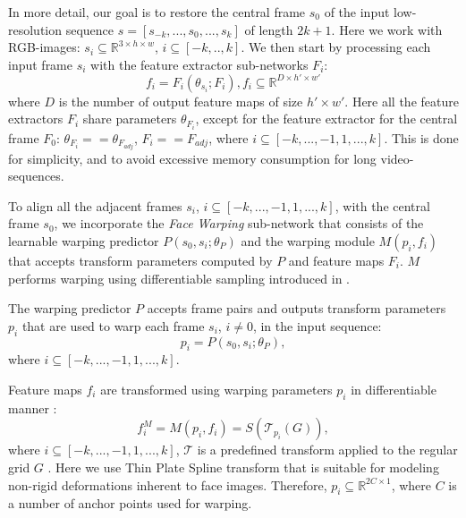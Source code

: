In more detail, our goal is to restore the central frame $s_{0}$ of the input low-resolution sequence $s = [s_{-k}, ..., s_{0}, ..., s_{k}]$ of length $2k+1$. Here we work with RGB-images: $s_{i}\subseteq \mathbb{R}^{3\times h \times w}$, $i\subseteq [-k,..,k]$. We then start by processing each input frame $s_{i}$ with the feature extractor sub-networks $F_{i}$:
\begin{equation}
 f_{i} = F_{i}(\theta_{s_{i}}; F_{i}), 
 f_{i}\subseteq \mathbb{R}^{D\times {h}' \times {w}'}
\end{equation}
where $D$ is the number of output feature maps of size ${h}'\times{w}'$. Here all the feature extractors $F_{i}$ share parameters $\theta_{F_{i}}$, except for the feature extractor for the central frame $F_{0}$: $\theta_{F_{i}} == \theta_{F_{adj}}$, $F_{i} == F_{adj}$, where $i\subseteq [-k,..., -1, 1, ..., k]$. This is done for simplicity, and to avoid excessive memory consumption for long video-sequences.

To align all the adjacent frames $s_{i}$,  $i\subseteq [-k,..., -1, 1, ..., k]$, with the central frame $ s_{0}$, we incorporate the \emph{Face Warping} sub-network that consists of the learnable warping predictor $P(s_{0}, s_{i};\theta_{P})$ and the warping module $M(p_{i}, f_{i})$ that accepts transform parameters computed by $P$ and feature maps $F_{i}$. $M$ performs warping using differentiable sampling introduced in \cite{JaderbergSZK15}.

The warping predictor $P$ accepts frame pairs and outputs transform parameters $p_{i}$  that are used to warp each frame $s_{i}$, $i\neq0$, in the input sequence: 
\begin{equation}
    p_{i} = P(s_{0}, s_{i};\theta_{P}),
\end{equation}
where $i\subseteq [-k,..., -1, 1, ..., k]$.

Feature maps $f_{i}$ are transformed using warping parameters $p_{i}$ in differentiable manner \cite{JaderbergSZK15}: 
\begin{equation}
    f_{i}^{M}= M(p_{i}, f_{i}) = S(\mathcal{T}_{p_{i}}(G)), 
\end{equation}
where $i\subseteq[-k,..., -1, 1, ..., k]$, $\mathcal{T}$ is a predefined transform applied to the regular grid $G$ \cite{JaderbergSZK15}. Here we use Thin Plate Spline transform that is suitable for modeling non-rigid deformations inherent to face images. Therefore, $p_{i}\subseteq  \mathbb{R}^{2C\times 1 }$, where $C$ is a number of anchor points used for warping.

